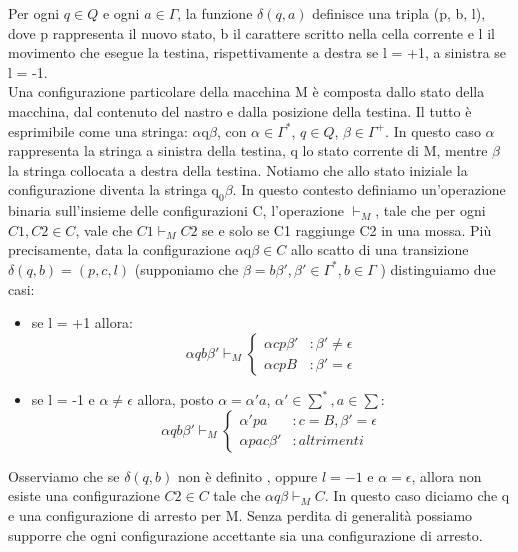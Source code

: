Per ogni $q \in Q$ e ogni $a \in \Gamma$, la funzione $\delta(q, a)$ definisce una tripla (p, b, l), dove p rappresenta il nuovo stato, b il carattere scritto nella cella corrente e l il movimento che esegue la testina, rispettivamente a destra se l = +1, a sinistra se l = -1.\\
Una configurazione particolare della macchina M è composta dallo stato della macchina, dal contenuto del nastro e dalla posizione della testina. Il tutto è esprimibile come una stringa: $\alpha$q$\beta$, con $\alpha \in \Gamma^*$, $q \in Q$, $\beta \in \Gamma^+$. In questo caso $\alpha$ rappresenta la stringa a sinistra della testina, q lo stato corrente di M, mentre $\beta$ la stringa collocata a destra della testina. Notiamo che allo stato iniziale la configurazione diventa la stringa $\mathrm{q}_{0} \beta$. In questo contesto definiamo un'operazione binaria sull'insieme delle configurazioni C, l'operazione $\vdash_{M}$, tale che per ogni $C1, C2 \in C$, vale che $C1 \vdash_{M} C2$ se e solo se C1 raggiunge C2 in una mossa. Più precisamente, data la configurazione $\alpha$q$\beta \in C$ allo scatto di una transizione $\delta(q, b) = (p, c, l)$ (supponiamo che $\beta = b\beta', \beta' \in \Gamma^*, b \in \Gamma$ ) distinguiamo due casi:\\
\begin{itemize}
\item{se l = +1 allora:}
\[\alpha qb \beta' \vdash_{M} \left\{
  \begin{array}{lr}
    \alpha cp \beta' & : \beta' \neq \epsilon\\
    \alpha cpB & : \beta' = \epsilon
  \end{array}
\right.
\]
\item{se l = -1 e $\alpha \neq \epsilon$ allora, posto $\alpha = \alpha' a $, $\alpha' \in \sum^*, a \in \sum$:}
\[\alpha qb \beta' \vdash_{M} \left\{
  \begin{array}{lr}
    \alpha' pa & : c = B, \beta' = \epsilon\\
    \alpha pac\beta' & : altrimenti
  \end{array}
\right.
\]
\end{itemize}
Osserviamo che se $\delta(q,b)$ non è definito , oppure $l = -1$ e $\alpha = \epsilon$, allora non esiste una configurazione $C2 \in C$ tale che $\alpha q \beta \vdash_{M} C$. In questo caso diciamo che q e una configurazione di arresto per M. Senza perdita di generalità possiamo supporre che ogni configurazione accettante sia una configurazione di arresto.\\
